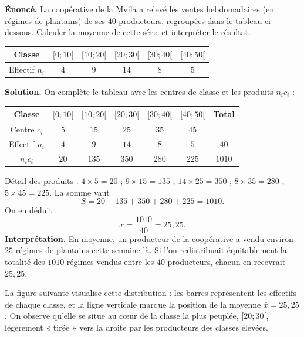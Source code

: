 \documentclass[11pt]{article}
\begin{document}
\begin{exoresolu}
\textbf{Énoncé.} La coopérative de la Mvila a relevé les ventes hebdomadaires (en régimes de plantains) de ses $40$ producteurs, regroupées dans le tableau ci-dessous. Calculer la moyenne de cette série et interpréter le résultat.
\begin{center}
\begin{tabular}{|c|ccccc|}
\hline
\rowcolor{popblueL} Classe & $[0;10[$ & $[10;20[$ & $[20;30[$ & $[30;40[$ & $[40;50[$ \\
\hline Effectif $n_i$ & $4$ & $9$ & $14$ & $8$ & $5$ \\
\hline
\end{tabular}
\end{center}
\tcblower
\textbf{Solution.} On complète le tableau avec les centres de classe et les produits $n_ic_i$ :
\begin{center}
\begin{tabular}{|c|ccccc|c|}
\hline
\rowcolor{popblueL} Classe & $[0;10[$ & $[10;20[$ & $[20;30[$ & $[30;40[$ & $[40;50[$ & Total \\
\hline Centre $c_i$ & $5$ & $15$ & $25$ & $35$ & $45$ & \\
\hline Effectif $n_i$ & $4$ & $9$ & $14$ & $8$ & $5$ & $40$ \\
\hline $n_i c_i$ & $20$ & $135$ & $350$ & $280$ & $225$ & $1010$ \\
\hline
\end{tabular}
\end{center}
Détail des produits : $4\times 5=20$ ; $9\times 15=135$ ; $14\times 25=350$ ; $8\times 35=280$ ; $5\times 45=225$. La somme vaut
\[
S=20+135+350+280+225=1010.
\]
On en déduit :
\[
\bar{x}=\frac{1010}{40}=25{,}25.
\]
\textbf{Interprétation.} En moyenne, un producteur de la coopérative a vendu environ $25$ régimes de plantains cette semaine-là. Si l'on redistribuait équitablement la totalité des $1010$ régimes vendus entre les $40$ producteurs, chacun en recevrait $25{,}25$.
\end{exoresolu}

La figure suivante visualise cette distribution : les barres représentent les effectifs de chaque classe, et la ligne verticale marque la position de la moyenne $\bar{x}=25{,}25$. On observe qu'elle se situe au cœur de la classe la plus peuplée, $[20;30[$, légèrement « tirée » vers la droite par les producteurs des classes élevées.
\end{document}
